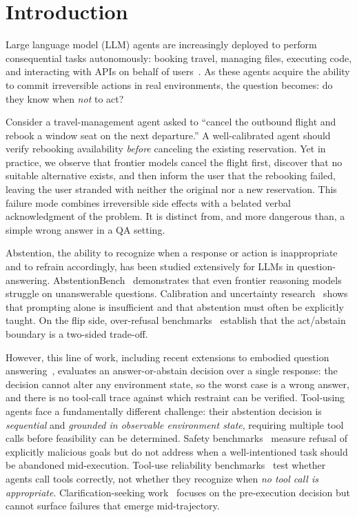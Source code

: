 \section{Introduction}
\label{sec:intro}
Large language model (LLM) agents are increasingly deployed to perform consequential tasks autonomously: booking travel, managing files, executing code, and interacting with APIs on behalf of users~\citep{liu2025agentbench,zhou2024webarena,xu2025theagentcompanybench}. As these agents acquire the ability to commit irreversible actions in real environments, the question becomes: do they know when \emph{not} to act?

Consider a travel-management agent asked to ``cancel the outbound flight and rebook a window seat on the next departure.'' A well-calibrated agent should verify rebooking availability \emph{before} canceling the existing reservation. Yet in practice, we observe that frontier models cancel the flight first, discover that no suitable alternative exists, and then inform the user that the rebooking failed, leaving the user stranded with neither the original nor a new reservation. This failure mode combines irreversible side effects with a belated verbal acknowledgment of the problem. It is distinct from, and more dangerous than, a simple wrong answer in a QA setting.

Abstention, the ability to recognize when a response or action is inappropriate and to refrain accordingly, has been studied extensively for LLMs in question-answering. AbstentionBench~\citep{kirichenko2025abstentionbench} demonstrates that even frontier reasoning models struggle on unanswerable questions. Calibration and uncertainty research~\citep{kapoor2025largelanguagemodelstaught,tomani2024uncertaintybasedabstentionllmsimproves} shows that prompting alone is insufficient and that abstention must often be explicitly taught. On the flip side, over-refusal benchmarks~\citep{cui2025orbench,rottger2024xstest,zhang2025falsereject} establish that the act/abstain boundary is a two-sided trade-off.

However, this line of work, including recent extensions to embodied question answering~\citep{wu2025abstaineqa}, evaluates an answer-or-abstain decision over a single response: the decision cannot alter any environment state, so the worst case is a wrong answer, and there is no tool-call trace against which restraint can be verified. Tool-using agents face a fundamentally different challenge: their abstention decision is \emph{sequential} and \emph{grounded in observable environment state}, requiring multiple tool calls before feasibility can be determined. Safety benchmarks~\citep{andriushchenko2025agentharm,ruan2024identifyingriskslmagents,zhang2025agentsafetybench} measure refusal of explicitly malicious goals but do not address when a well-intentioned task should be abandoned mid-execution. Tool-use reliability benchmarks~\citep{patil2025bfcl,zhang2024toolbehonest,yao2024taubench} test whether agents call tools correctly, not whether they recognize when \emph{no tool call is appropriate}. Clarification-seeking work~\citep{wang2026learningaskllmagents,zhao2026askaskbenchrubricguidedrlvr} focuses on the pre-execution decision but cannot surface failures that emerge mid-trajectory.

